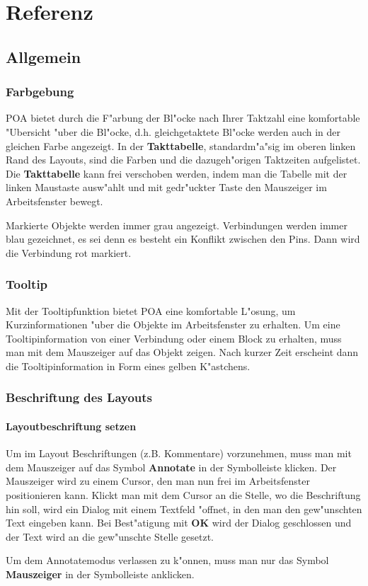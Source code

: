 \documentclass[a4paper,titlepage,12pt,ngerman]{scrbook}
\begin{document}
\chapter{Referenz}

\section{Allgemein}
\subsection{Farbgebung}
POA bietet durch die F"arbung der Bl"ocke nach Ihrer Taktzahl eine komfortable "Ubersicht "uber die Bl"ocke, d.h. gleichgetaktete Bl"ocke werden auch in der gleichen Farbe angezeigt.\newline
In der {\bf Takttabelle}, standardm"a"sig im oberen linken Rand des Layouts, sind die Farben und die dazugeh"origen Taktzeiten aufgelistet. Die {\bf Takttabelle} kann frei verschoben werden, indem man die Tabelle mit der linken Maustaste ausw"ahlt und mit gedr"uckter Taste den Mauszeiger im Arbeitsfenster bewegt.\par
Markierte Objekte werden immer grau angezeigt.\newline
Verbindungen werden immer blau gezeichnet, es sei denn es besteht ein Konflikt zwischen den Pins. Dann wird die Verbindung rot markiert.


\subsection{Tooltip}
Mit der Tooltipfunktion bietet POA eine komfortable L"osung, um Kurzinformationen "uber die Objekte im Arbeitsfenster zu erhalten. Um eine Tooltipinformation von einer Verbindung oder einem Block zu erhalten, muss man mit dem Mauszeiger auf das Objekt zeigen. Nach kurzer Zeit erscheint dann die Tooltipinformation in Form eines gelben K"astchens.

\subsection{Beschriftung des Layouts}
\subsubsection{Layoutbeschriftung setzen}
Um im Layout Beschriftungen (z.B. Kommentare) vorzunehmen, muss man mit dem Mauszeiger auf das Symbol {\bf Annotate} in der Symbolleiste klicken.%
Der Mauszeiger wird zu einem Cursor, den man nun frei im Arbeitsfenster positionieren kann. Klickt man mit dem Cursor an die Stelle, wo die Beschriftung hin soll, wird ein Dialog mit einem Textfeld "offnet, in den man den gew"unschten Text eingeben kann. Bei Best"atigung mit {\bf OK} wird der Dialog geschlossen und der Text wird an die gew"unschte Stelle gesetzt.\par
Um dem Annotatemodus verlassen zu k"onnen, muss man nur das Symbol {\bf Mauszeiger} in der Symbolleiste anklicken.
\end{document}
